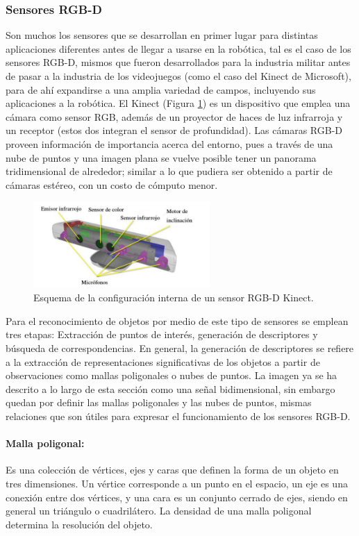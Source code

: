 \subsubsection{Sensores RGB-D}
Son muchos los sensores que se desarrollan en primer lugar para distintas aplicaciones diferentes antes de llegar a usarse en la robótica, tal es el caso de los sensores RGB-D, mismos que fueron desarrollados para la industria militar antes de pasar a la industria de los videojuegos (como el caso del Kinect de Microsoft), para de ahí expandirse a una amplia variedad de campos, incluyendo sus aplicaciones a la robótica. El Kinect (Figura \ref{fig:rgbd}) es un dispositivo que emplea una cámara como sensor RGB, además de un proyector de haces de luz infrarroja y un receptor (estos dos integran el sensor de profundidad). Las cámaras RGB-D proveen información de importancia acerca del entorno, pues a través de una nube de puntos y una imagen plana se vuelve posible tener un panorama tridimensional de alrededor; similar a lo que pudiera ser obtenido a partir de cámaras estéreo, con un costo de cómputo menor.
\begin{figure}[htbp!]
	\centering
	\includegraphics[width=0.6\textwidth]{./Figuras/RGB-D}
	\caption{Esquema de la configuración interna de un sensor RGB-D Kinect.}
	\label{fig:rgbd}
\end{figure}
\par Para el reconocimiento de objetos por medio de este tipo de sensores se emplean tres etapas: Extracción de puntos de interés, generación de descriptores y búsqueda de correspondencias. En general, la generación de descriptores se refiere a la extracción de representaciones significativas de los objetos a partir de observaciones como mallas poligonales o nubes de puntos. La imagen ya se ha descrito a lo largo de esta sección como una señal bidimensional, sin embargo quedan por definir las mallas poligonales y las nubes de puntos, mismas relaciones que son útiles para expresar el funcionamiento de los sensores RGB-D.
\paragraph{Malla poligonal:} Es una colección de vértices, ejes y caras que definen la forma de un objeto en tres dimensiones. Un vértice corresponde a un punto en el espacio, un eje es una conexión entre dos vértices, y una cara es un conjunto cerrado de ejes, siendo en general un triángulo o cuadrilátero. La densidad de una malla poligonal determina la resolución del objeto.
